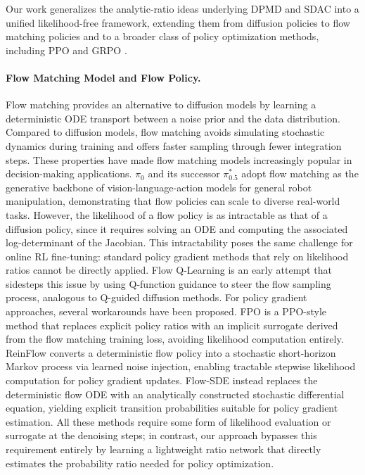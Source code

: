 Our work generalizes the analytic-ratio ideas underlying DPMD and SDAC into a unified likelihood-free framework, extending them from diffusion policies to flow matching policies and to a broader class of policy optimization methods, including PPO \cite{schulman2017proximal} and GRPO \cite{shao2024deepseekmath}.

\paragraph{Flow Matching Model and Flow Policy.}
Flow matching \cite{lipman2022flow,liu2022flow} provides an alternative to diffusion models by learning a deterministic ODE transport between a noise prior and the data distribution. Compared to diffusion models, flow matching avoids simulating stochastic dynamics during training and offers faster sampling through fewer integration steps. These properties have made flow matching models increasingly popular in decision-making applications. $\pi_0$ \cite{black2024pi} and its successor $\pi_{0.5}^*$ \cite{intelligence2025pi} adopt flow matching as the generative backbone of vision-language-action models for general robot manipulation, demonstrating that flow policies can scale to diverse real-world tasks. However, the likelihood of a flow policy is as intractable as that of a diffusion policy, since it requires solving an ODE and computing the associated log-determinant of the Jacobian. This intractability poses the same challenge for online RL fine-tuning: standard policy gradient methods that rely on likelihood ratios cannot be directly applied. Flow Q-Learning \cite{park2025flow} is an early attempt that sidesteps this issue by using Q-function guidance to steer the flow sampling process, analogous to Q-guided diffusion methods. For policy gradient approaches, several workarounds have been proposed. FPO \cite{mcallister2025flow} is a PPO-style method that replaces explicit policy ratios with an implicit surrogate derived from the flow matching training loss, avoiding likelihood computation entirely. ReinFlow \cite{zhang2025reinflow} converts a deterministic flow policy into a stochastic short-horizon Markov process via learned noise injection, enabling tractable stepwise likelihood computation for policy gradient updates. Flow-SDE \cite{chen2025pirl} instead replaces the deterministic flow ODE with an analytically constructed stochastic differential equation, yielding explicit transition probabilities suitable for policy gradient estimation. All these methods require some form of likelihood evaluation or surrogate at the denoising steps; in contrast, our approach bypasses this requirement entirely by learning a lightweight ratio network that directly estimates the probability ratio needed for policy optimization.








